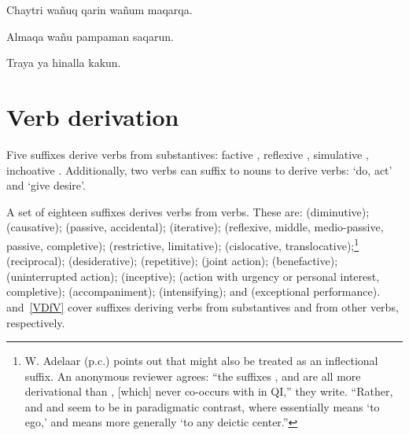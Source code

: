 %
{Chaytri wañuq qarin wañum maqarqa.}%
{}%
{}{}%

%
{Almaqa wañu pampaman saqarun.}%
{}%
{}{}%

%
{Traya ya hinalla kakun.}%
{}%
{}{}%

\section{Verb derivation}\label{sec:verbderivation}
Five suffixes derive verbs from substantives: factive , reflexive , simulative , inchoative . Additionally, two verbs can suffix to nouns to derive verbs:  ‘do, act’ and  ‘give desire’.

A set of eighteen suffixes derives verbs from verbs. These are:  (diminutive);  (causative);  (passive, accidental);  (iterative);  (reflexive, middle, medio-passive, passive, completive);  (restrictive, limitative);  (cislocative, translocative);\footnote{W. Adelaar (p.c.) points out that  might also be treated as an inflectional suffix. An anonymous reviewer agrees: “the suffixes ,  and  are all more derivational than , [which] never co-occurs with  in QI,” they write. “Rather,  and and  seem to be in paradigmatic contrast, where  essentially means ‘to ego,’ and  means more generally ‘to any deictic center.”}  (reciprocal);  (desiderative);  (repetitive);  (joint action);  (benefactive);  (uninterrupted action);  (inceptive);  (action with urgency or personal interest, completive);  (accompaniment);  (intensifying); and  (exceptional performance).  and~\ref{VDfV} cover suffixes deriving verbs from substantives and from other verbs, respectively.

